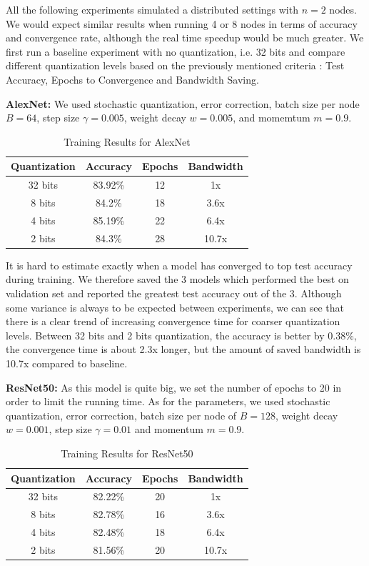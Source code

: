 \documentclass[10pt,conference,compsocconf]{IEEEtran}
\begin{document}
All the following experiments simulated a distributed settings with $n = 2$ nodes. We would expect similar results when running 4 or 8 nodes in terms of accuracy and convergence rate, although the real time speedup would be much greater. We first run a baseline experiment with no quantization, i.e. 32 bits and compare different quantization levels based on the previously mentioned criteria : Test Accuracy, Epochs to Convergence and Bandwidth Saving.

\textbf{AlexNet:} We used stochastic quantization, error correction, batch size per node $B = 64$, step size $\gamma = 0.005$, weight decay $w = 0.005$, and momemtum $m = 0.9$. 

\begin{table}[htbp]
  \centering
  \begin{tabular}[c]{|c||c|c|c|}
    \hline
	  Quantization&Accuracy&Epochs&Bandwidth\\
    \hline
	  32 bits&83.92\% &12&1x\\
	  8 bits&84.2\%&18&3.6x\\
	  4 bits&85.19\%&22&6.4x\\
	  2 bits&84.3\%&28&10.7x\\
    \hline
  \end{tabular}
	\vspace{0.7em}
	\caption{Training Results for AlexNet}
\end{table}

\vspace{-1.5em}
\noindent It is hard to estimate exactly when a model has converged to top test accuracy during training. We therefore saved the 3 models which performed the best on validation set and reported the greatest test accuracy out of the 3. Although some variance is always to be expected between experiments, we can see that there is a clear trend of increasing convergence time for coarser quantization levels. Between 32 bits and 2 bits quantization, the accuracy is better by 0.38\%, the convergence time is about 2.3x longer, but the amount of saved bandwidth is 10.7x compared to baseline.
\vspace{0.3em}


\textbf{ResNet50:} As this model is quite big, we set the number of epochs to 20 in order to limit the running time. As for the parameters, we used stochastic quantization, error correction, batch size per node of $B = 128$, weight decay $w = 0.001$, step size $\gamma = 0.01$ and momentum $m = 0.9$.
\begin{table}[htbp]
  \centering
  \begin{tabular}[c]{|c||c|c|c|}
    \hline
          Quantization&Accuracy&Epochs&Bandwidth\\
    \hline
          32 bits&82.22\% &20&1x\\
          8 bits&82.78\%&16&3.6x\\
          4 bits&82.48\%&18&6.4x\\
          2 bits&81.56\%&20&10.7x\\
    \hline
  \end{tabular}
        \vspace{0.7em}
        \caption{Training Results for ResNet50}
\end{table}
\end{document}
